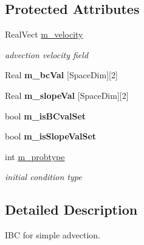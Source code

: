 \subsection*{Protected Attributes}
\begin{DoxyCompactItemize}
\item 
\hypertarget{class_advect_scalar_i_b_c_ab909375404e9d5a55e5098bc90ba36fb}{Real\-Vect \hyperlink{class_advect_scalar_i_b_c_ab909375404e9d5a55e5098bc90ba36fb}{m\-\_\-velocity}}\label{class_advect_scalar_i_b_c_ab909375404e9d5a55e5098bc90ba36fb}

\begin{DoxyCompactList}\small\item\em advection velocity field \end{DoxyCompactList}\item 
\hypertarget{class_advect_scalar_i_b_c_a746cf68619a9dfce1c6103a17e261f95}{Real {\bfseries m\-\_\-bc\-Val} \mbox{[}Space\-Dim\mbox{]}\mbox{[}2\mbox{]}}\label{class_advect_scalar_i_b_c_a746cf68619a9dfce1c6103a17e261f95}

\item 
\hypertarget{class_advect_scalar_i_b_c_ac4374b5bad2f3d1844310d1156005586}{Real {\bfseries m\-\_\-slope\-Val} \mbox{[}Space\-Dim\mbox{]}\mbox{[}2\mbox{]}}\label{class_advect_scalar_i_b_c_ac4374b5bad2f3d1844310d1156005586}

\item 
\hypertarget{class_advect_scalar_i_b_c_a99c46efed316295b672f0dc0918acf8c}{bool {\bfseries m\-\_\-is\-B\-Cval\-Set}}\label{class_advect_scalar_i_b_c_a99c46efed316295b672f0dc0918acf8c}

\item 
\hypertarget{class_advect_scalar_i_b_c_ab9b58b2b2cd47a7700eb34c4049bd8e9}{bool {\bfseries m\-\_\-is\-Slope\-Val\-Set}}\label{class_advect_scalar_i_b_c_ab9b58b2b2cd47a7700eb34c4049bd8e9}

\item 
\hypertarget{class_advect_scalar_i_b_c_a3c8be720c26e70ab0c0c8731545d719a}{int \hyperlink{class_advect_scalar_i_b_c_a3c8be720c26e70ab0c0c8731545d719a}{m\-\_\-probtype}}\label{class_advect_scalar_i_b_c_a3c8be720c26e70ab0c0c8731545d719a}

\begin{DoxyCompactList}\small\item\em initial condition type \end{DoxyCompactList}\end{DoxyCompactItemize}


\subsection{Detailed Description}
I\-B\-C for simple advection. 

